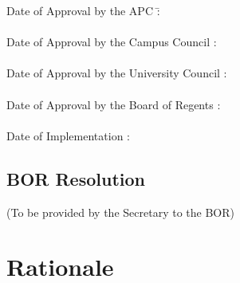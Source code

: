 \documentclass[11pt,a4paper]{article}
\begin{document}

\newpage
\thispagestyle{empty}
\begin{tabbing}
Date of Approval by the APC \hspace{1in}\= : \\
\\
Date of Approval by the Campus Council \> : \\
\\
Date of Approval by the University Council \> : \\
\\
Date of Approval by the Board of Regents \> : \\
\\
Date of Implementation \> : \\
\end{tabbing}

\newpage
\thispagestyle{empty}
\subsection*{BOR Resolution}

(To be provided by the Secretary to the BOR)

\newpage

\section{Rationale}
\end{document}
